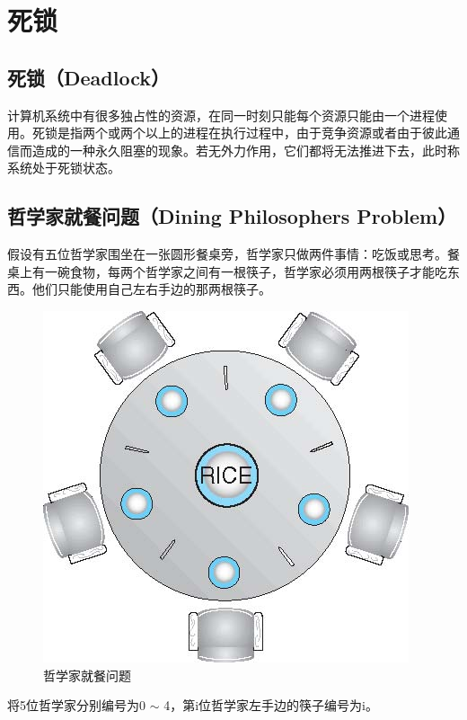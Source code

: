 \newpage

\section{死锁}

\subsection{死锁（Deadlock）}

计算机系统中有很多独占性的资源，在同一时刻只能每个资源只能由一个进程使用。死锁是指两个或两个以上的进程在执行过程中，由于竞争资源或者由于彼此通信而造成的一种永久阻塞的现象。若无外力作用，它们都将无法推进下去，此时称系统处于死锁状态。\\

\subsection{哲学家就餐问题（Dining Philosophers Problem）}

假设有五位哲学家围坐在一张圆形餐桌旁，哲学家只做两件事情：吃饭或思考。餐桌上有一碗食物，每两个哲学家之间有一根筷子，哲学家必须用两根筷子才能吃东西。他们只能使用自己左右手边的那两根筷子。

\begin{figure}[H]
    \centering
    \includegraphics[]{img/C2/2-8/1.png}
    \caption{哲学家就餐问题}
\end{figure}

将5位哲学家分别编号为0 $\sim $ 4，第i位哲学家左手边的筷子编号为i。

